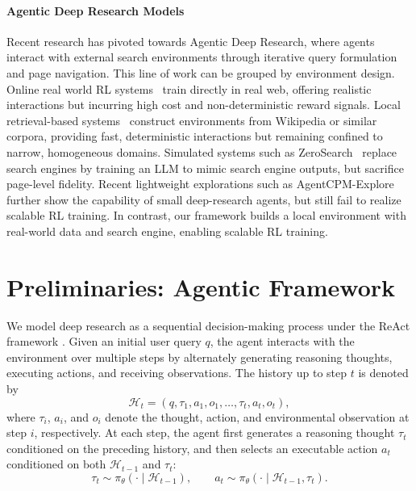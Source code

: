 \documentclass{article} %
\theoremstyle{plain}
\theoremstyle{definition}
\theoremstyle{remark}
\begin{document}
\paragraph{Agentic Deep Research Models}
Recent research has pivoted towards Agentic Deep Research, where agents interact with external search environments through iterative query formulation and page navigation. This line of work can be grouped by environment design. Online real world RL systems~\citep{zheng2025deepresearcher,li2025webthinker,li2025websailor} train directly in real web, offering realistic interactions but incurring high cost and non-deterministic reward signals. Local retrieval-based systems~\citep{jin2025search,li2025search,gao2025beyond} construct environments from Wikipedia or similar corpora, providing fast, deterministic interactions but remaining confined to narrow, homogeneous domains. Simulated systems such as ZeroSearch~\citep{sun2025zerosearch} replace search engines by training an LLM to mimic search engine outputs, but sacrifice page-level fidelity. Recent lightweight explorations such as AgentCPM-Explore~\citep{chen2026agentcpm} further show the capability of small deep-research agents, but still fail to realize scalable RL training. In contrast, our framework builds a local environment with real-world data and search engine, enabling scalable RL training.

\section{Preliminaries: Agentic Framework}
\label{sec:preliminaries}

We model deep research as a sequential decision-making process under the ReAct framework \citep{yao2022react}. Given an initial user query $q$, the agent interacts with the environment over multiple steps by alternately generating reasoning thoughts, executing actions, and receiving observations. The history up to step $t$ is denoted by
\begin{equation*}
    \mathcal{H}_t = (q, \tau_1, a_1, o_1, \dots, \tau_t, a_t, o_t),
\end{equation*}
where $\tau_i$, $a_i$, and $o_i$ denote the thought, action, and environmental observation at step $i$, respectively. At each step, the agent first generates a reasoning thought $\tau_t$ conditioned on the preceding history, and then selects an executable action $a_t$ conditioned on both $\mathcal{H}_{t-1}$ and $\tau_t$:
\begin{equation*}
    \tau_t \sim \pi_\theta(\cdot \mid \mathcal{H}_{t-1}), \qquad a_t \sim \pi_\theta(\cdot \mid \mathcal{H}_{t-1}, \tau_t).
\end{equation*}
\end{document}
